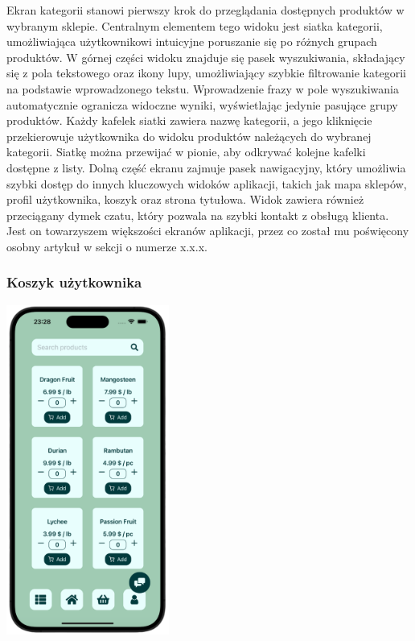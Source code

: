 Ekran kategorii stanowi pierwszy krok do przeglądania dostępnych produktów w wybranym sklepie. Centralnym elementem tego widoku jest siatka kategorii, umożliwiająca użytkownikowi intuicyjne poruszanie się po różnych grupach produktów. W górnej części widoku znajduje się pasek wyszukiwania, składający się z pola tekstowego oraz ikony lupy, umożliwiający szybkie filtrowanie kategorii na podstawie wprowadzonego tekstu. Wprowadzenie frazy w pole wyszukiwania automatycznie ogranicza widoczne wyniki, wyświetlając jedynie pasujące grupy produktów. Każdy kafelek siatki zawiera nazwę kategorii, a jego kliknięcie przekierowuje użytkownika do widoku produktów należących do wybranej kategorii. Siatkę można przewijać w pionie, aby odkrywać kolejne kafelki dostępne z listy. Dolną część ekranu zajmuje pasek nawigacyjny, który umożliwia szybki dostęp do innych kluczowych widoków aplikacji, takich jak mapa sklepów, profil użytkownika, koszyk oraz strona tytułowa. Widok zawiera również przeciągany dymek czatu, który pozwala na szybki kontakt z obsługą klienta. Jest on towarzyszem większości ekranów aplikacji, przez co został mu poświęcony osobny artykuł w sekcji o numerze x.x.x.

\subsubsection{Koszyk użytkownika}
\begin{center} 
    \includegraphics[width=0.4\textwidth]{images/front/products_page.png}  
\end{center}

